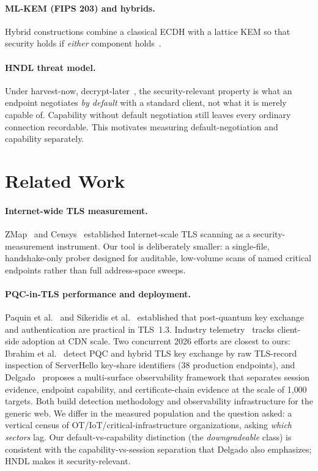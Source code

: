 \documentclass[11pt]{article}
\begin{document}
\paragraph{ML-KEM (FIPS 203) and hybrids.}
Hybrid constructions combine a classical ECDH with a lattice KEM so that security holds
if \emph{either} component holds~\cite{fips203,paquin2020}.

\paragraph{HNDL threat model.}
Under harvest-now, decrypt-later~\cite{mosca2018}, the security-relevant property is
what an endpoint negotiates \emph{by default} with a standard client, not what it is
merely capable of. Capability without default negotiation still leaves every ordinary
connection recordable. This motivates measuring default-negotiation and
capability separately.

\section{Related Work}
\label{sec:related}

\paragraph{Internet-wide TLS measurement.}
ZMap~\cite{zmap} and Censys~\cite{censys} established Internet-scale TLS scanning as a
security-measurement instrument. Our tool is deliberately smaller: a single-file,
handshake-only prober designed for auditable, low-volume scans of named critical
endpoints rather than full address-space sweeps.

\paragraph{PQC-in-TLS performance and deployment.}
Paquin et al.~\cite{paquin2020} and Sikeridis et al.~\cite{sikeridis2020} established
that post-quantum key exchange and authentication are practical in TLS~1.3.
Industry telemetry~\cite{westerbaan2024state} tracks client-side adoption at CDN scale.
Two concurrent 2026 efforts are closest to ours: Ibrahim et al.~\cite{ibrahim2026raw}
detect PQC and hybrid TLS key exchange by raw TLS-record inspection of ServerHello
key-share identifiers (38 production endpoints), and Delgado~\cite{delgado2026observability}
proposes a multi-surface observability framework that separates session evidence,
endpoint capability, and certificate-chain evidence at the scale of 1{,}000 targets.
Both build detection methodology and observability infrastructure for the generic
web. We differ in the measured population and the question asked: a vertical census of
OT/IoT/critical-infrastructure organizations, asking \emph{which sectors} lag. Our
default-vs-capability distinction (the \emph{downgradeable} class) is consistent with
the capability-vs-session separation that Delgado also emphasizes; HNDL makes it
security-relevant.
\end{document}
